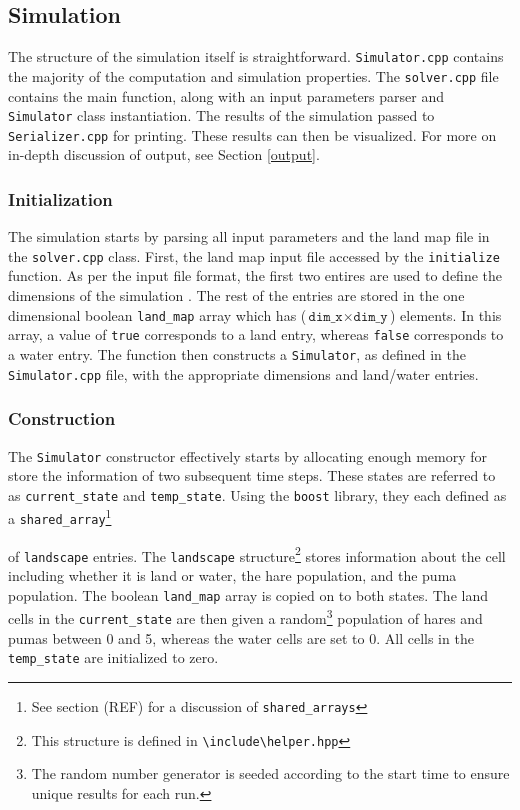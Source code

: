 \documentclass[a4paper,11pt]{article}
\begin{document}
{\subsection{Simulation}

The structure of the simulation itself is straightforward.  \texttt{Simulator.cpp} contains the majority of the computation and simulation properties.  The \texttt{solver.cpp} file contains the main function, along with an input parameters parser and \texttt{Simulator} class instantiation.  The results of the simulation passed to \texttt{Serializer.cpp} for printing.  These results can then be visualized.  For more on in-depth discussion of output, see Section \ref{output}.

\subsubsection{Initialization}

The simulation starts by parsing all input parameters and the land map file in the \texttt{solver.cpp} class.  First, the land map input file accessed by the \texttt{initialize} function.  As per the input file format, the first two entires are used to define the dimensions of the simulation .  The rest of the entries are stored in the one dimensional boolean \texttt{land\_map} array which has ($\texttt{dim\_x} \times \texttt{dim\_y}$) elements.  In this array, a value of \texttt{true} corresponds to a land entry, whereas \texttt{false} corresponds to a water entry.  The function then constructs a \texttt{Simulator}, as defined in the \texttt{Simulator.cpp} file, with the appropriate dimensions and land/water entries.  

\subsubsection{Construction}

The \texttt{Simulator} constructor effectively starts by allocating enough memory for store the information of two subsequent time steps.  These states are  referred to as \texttt{current\_state} and \texttt{temp\_state}.  Using the \texttt{boost} library, they each defined as a \texttt{shared\_array}\footnote{See section (REF) for a discussion of \texttt{shared\_arrays}}} of \texttt{landscape} entries.  The \texttt{landscape} structure\footnote{This structure is defined in \texttt{\textbackslash include\textbackslash helper.hpp}} stores information about the cell including whether it is land or water, the hare population, and the puma population. The boolean \texttt{land\_map} array is copied on to both states.  The land cells in the \texttt{current\_state} are then given a random\footnote{The random number generator is seeded according to the start time to ensure unique results for each run.} population of hares and pumas between 0 and 5, whereas the water cells are set to 0.  All cells in the \texttt{temp\_state} are initialized to zero.
\end{document}
